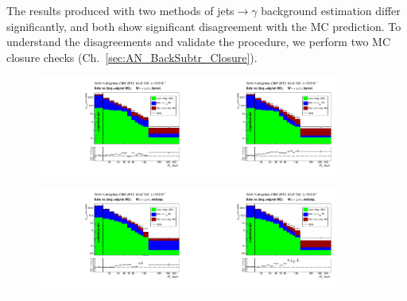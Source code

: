 The results produced with two methods of jets$\rightarrow\gamma$ background estimation differ significantly, and both show significant disagreement with the MC prediction. To understand the disagreements and validate the procedure, we perform two MC closure checks (Ch.~\ref{sec:AN_BackSubtr_Closure}). 

\begin{figure}[htb]
  \begin{center}
   \includegraphics[width=0.45\textwidth]{../figs/figs_v11/MUON_WGamma/PrepareYields/c_DATAvsBkgPlusSigMCc_MUON_WGamma_TEMPL_CHISO_UNblind__Barrel__phoEt.pdf}\includegraphics[width=0.45\textwidth]{../figs/figs_v11/MUON_WGamma/PrepareYields/c_DATAvsBkgPlusSigMCc_MUON_WGamma_TEMPL_SIHIH_UNblind__Barrel__phoEt.pdf}  \\
   \includegraphics[width=0.45\textwidth]{../figs/figs_v11/MUON_WGamma/PrepareYields/c_DATAvsBkgPlusSigMCc_MUON_WGamma_TEMPL_CHISO_UNblind__Endcap__phoEt.pdf}\includegraphics[width=0.45\textwidth]{../figs/figs_v11/MUON_WGamma/PrepareYields/c_DATAvsBkgPlusSigMCc_MUON_WGamma_TEMPL_SIHIH_UNblind__Endcap__phoEt.pdf}  \\

\end{center}
\end{figure}
